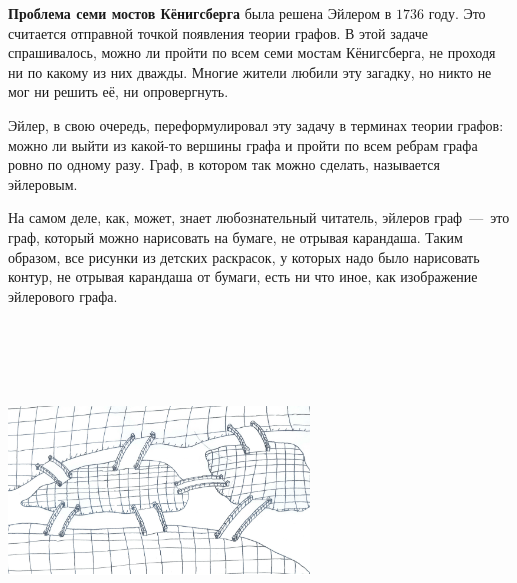
	\textbf{Проблема семи мостов Кёнигсберга} была решена Эйлером в $1736$ году. Это считается отправной точкой появления теории графов. 
	В этой задаче спрашивалось, можно ли пройти по всем семи мостам Кёнигсберга, не проходя ни по какому из них дважды. 
	Многие жители любили эту загадку, но никто не мог ни решить её, ни опровергнуть. 
	
	Эйлер, в свою очередь, переформулировал эту задачу в терминах теории графов: можно ли выйти из какой-то вершины графа и 
	пройти по всем ребрам графа ровно по одному разу. Граф, в котором так можно сделать, называется эйлеровым. 

	На самом деле, как, может, знает любознательный читатель, эйлеров граф~---~это граф, который можно нарисовать на бумаге, не отрывая карандаша. 
	Таким образом, все рисунки из детских раскрасок, у которых надо было нарисовать контур, не отрывая карандаша от бумаги, есть ни что иное, 
	как изображение эйлерового графа. 

\begin{center}
\includegraphics[width=8cm, height=9cm,keepaspectratio]{chapters/1/images/Keningsberg}
\;\ \;\ \;\ \;\ \;\ \;\ \;\ \;\ \;\ \;\
\end{center}

